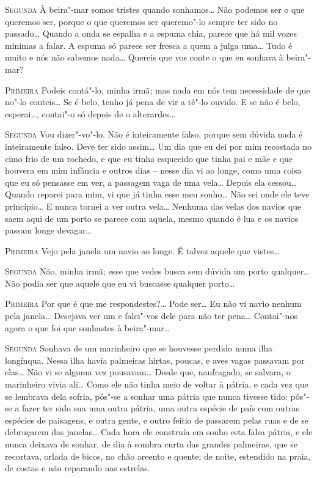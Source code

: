 \textsc{Segunda} À beira"-mar somos tristes
quando sonhamos\ldots{} Não podemos ser
o que queremos ser, porque o que queremos		%
ser queremo"-lo sempre ter
sido no passado\ldots{} Quando a onda se
espalha e a espuma chia, parece que
há mil vozes mínimas a falar. A espuma
só parece ser fresca a quem a
julga uma\ldots{} Tudo é muito e nós 
não sabemos nada\ldots{} Quereis que vos
conte o que eu sonhava à beira"-mar?

\textsc{Primeira} Podeis contá"-lo, minha irmã; mas nada em nós tem
necessidade de que no"-lo conteis\ldots{}
Se é belo, tenho já pena de vir a
tê"-lo ouvido. E se não é belo, esperai\ldots{},
contai"-o só depois de o
alterardes\ldots{}

\textsc{Segunda} Vou dizer"-vo"-lo. Não é 
inteiramente falso, porque sem
dúvida nada é inteiramente falso. Deve ter
sido assim\ldots{} Um dia que eu
dei por mim recostada no cimo frio de um rochedo, 
e que eu tinha esquecido que tinha pai e mãe e
que houvera em mim infância e outros
dias -- nesse dia vi ao longe, como uma coisa que 
eu só pensasse em ver,
a passagem vaga de uma vela\ldots{} Depois ela
cessou\ldots{} Quando reparei para
mim, vi que já tinha esse meu sonho\ldots{} Não sei onde ele teve
princípio\ldots{} E nunca tornei a ver outra
vela\ldots{} Nenhuma das velas dos
navios que saem aqui de um porto se parece com
aquela, mesmo quando é lua e os navios passam longe devagar\ldots{}

\textsc{Primeira} Vejo pela janela um navio ao longe.
É talvez aquele que vistes\ldots{}

\textsc{Segunda} Não, minha irmã; esse que
vedes busca sem dúvida um porto
qualquer\ldots{} Não podia ser que
aquele que eu vi buscasse qualquer porto\ldots{}

\textsc{Primeira} Por que é que me respondestes?\ldots{} 
Pode ser\ldots{} Eu não vi navio
nenhum pela janela\ldots{} Desejava ver um
e falei"-vos dele para não ter
pena\ldots{} Contai"-nos agora o que foi
que sonhastes à beira"-mar\ldots{} 

\textsc{Segunda} Sonhava de um marinheiro
que se houvesse perdido numa ilha
longínqua. Nessa ilha havia palmeiras hirtas, poucas, e aves vagas
passavam por elas\ldots{} Não vi se alguma
vez pousavam\ldots{} Desde que,
naufragado, se salvara, o marinheiro vivia
ali\ldots{} Como ele não tinha
meio de voltar à pátria, e cada vez que se lembrava dela sofria,
pôs"-se a sonhar uma pátria que nunca tivesse
tido: pôs"-se a fazer
ter sido sua uma outra pátria, uma outra espécie de país com outras
espécies de paisagens, e outra gente, e outro
feitio de passarem pelas
ruas e de se debruçarem das janelas\ldots{}
Cada hora ele construía em sonho
esta falsa pátria, e ele nunca deixava de sonhar,
de dia à sombra curta
das grandes palmeiras, que se recortava, orlada de bicos, no chão
areento e quente; de noite, estendido na praia, de costas e não
reparando nas estrelas.

